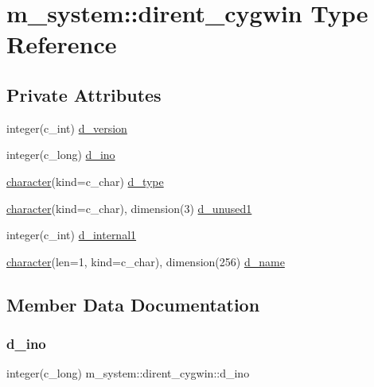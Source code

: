 \hypertarget{structm__system_1_1dirent__cygwin}{}\section{m\+\_\+system\+:\+:dirent\+\_\+cygwin Type Reference}
\label{structm__system_1_1dirent__cygwin}
\subsection*{Private Attributes}
\begin{DoxyCompactItemize}
\item 
integer(c\+\_\+int) \hyperlink{structm__system_1_1dirent__cygwin_a406355db287a68f3939379a9e2337484}{d\+\_\+version}
\item 
integer(c\+\_\+long) \hyperlink{structm__system_1_1dirent__cygwin_aaba36e38344bc1aa3da128a142fecd13}{d\+\_\+ino}
\item 
\hyperlink{option__stopwatch_83_8txt_abd4b21fbbd175834027b5224bfe97e66}{character}(kind=c\+\_\+char) \hyperlink{structm__system_1_1dirent__cygwin_a416199c581f2d978d4ff238ae11de028}{d\+\_\+type}
\item 
\hyperlink{option__stopwatch_83_8txt_abd4b21fbbd175834027b5224bfe97e66}{character}(kind=c\+\_\+char), dimension(3) \hyperlink{structm__system_1_1dirent__cygwin_ae193da2503dd1c4368b288bfb2677369}{d\+\_\+unused1}
\item 
integer(c\+\_\+int) \hyperlink{structm__system_1_1dirent__cygwin_a87c389181b48af24ef039be0d3ef110d}{d\+\_\+internal1}
\item 
\hyperlink{option__stopwatch_83_8txt_abd4b21fbbd175834027b5224bfe97e66}{character}(len=1, kind=c\+\_\+char), dimension(256) \hyperlink{structm__system_1_1dirent__cygwin_ae793965c099bb7d8ef2d753e1fb1108a}{d\+\_\+name}
\end{DoxyCompactItemize}


\subsection{Member Data Documentation}
\mbox{\label{structm__system_1_1dirent__cygwin_aaba36e38344bc1aa3da128a142fecd13}} 
\subsubsection{\texorpdfstring{d\+\_\+ino}{d\_ino}}
{\footnotesize\ttfamily integer(c\+\_\+long) m\+\_\+system\+::dirent\+\_\+cygwin\+::d\+\_\+ino\hspace{0.3cm}{\ttfamily [private]}}

